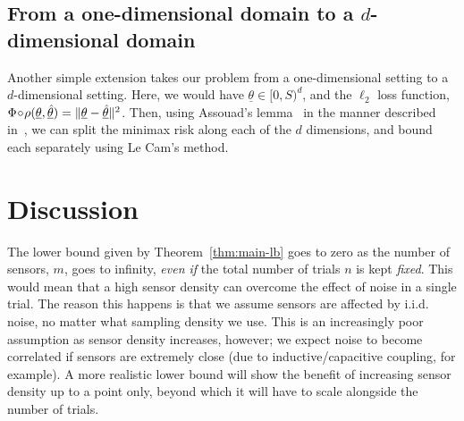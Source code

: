 \documentclass[conference]{IEEEtran}
\providecommand{\v}{}
\renewcommand{\v}[1]{\underline{#1}}
\providecommand{\vhat}{}
\renewcommand{\vhat}[1]{\underline{\hat{#1}}}
\DeclarePairedDelimiter\abs{\lvert}{\rvert}
\DeclarePairedDelimiter\norm{\lVert}{\rVert}
\newcommand{\Phiorho}{\Phi\!\circ\!\rho}
\begin{document}


\subsection{From a one-dimensional domain to a $d$-dimensional domain}

Another simple extension takes our problem from a one-dimensional setting to a
$d$-dimensional setting. Here, we would have $\v\theta \in [0, S)^d$, and the
$\ell_2$ loss function, $\Phiorho(\v\theta, \vhat\theta) = \norm{\v\theta -
\vhat\theta}^2$. Then, using Assouad's lemma~\cite{Tsybakov2009Introduction} in
the manner described in~\cite{Duchi2015Information}, we can split the minimax
risk along each of the $d$ dimensions, and bound each separately using Le Cam's
method.

\section{Discussion}
\label{sec:discussion}

The lower bound given by Theorem~\ref{thm:main-lb} goes to zero as the number
of sensors, $m$, goes to infinity, \emph{even if} the total number of trials
$n$ is kept \emph{fixed}. This would mean that a high sensor density can
overcome the effect of noise in a single trial. The reason this happens is that
we assume sensors are affected by i.i.d. noise, no matter what sampling density
we use. This is an increasingly poor assumption as sensor density increases,
however; we expect noise to become correlated if sensors are extremely close
(due to inductive/capacitive coupling, for example). A more realistic lower
bound will show the benefit of increasing sensor density up to a point only,
beyond which it will have to scale alongside the number of trials.
\end{document}
